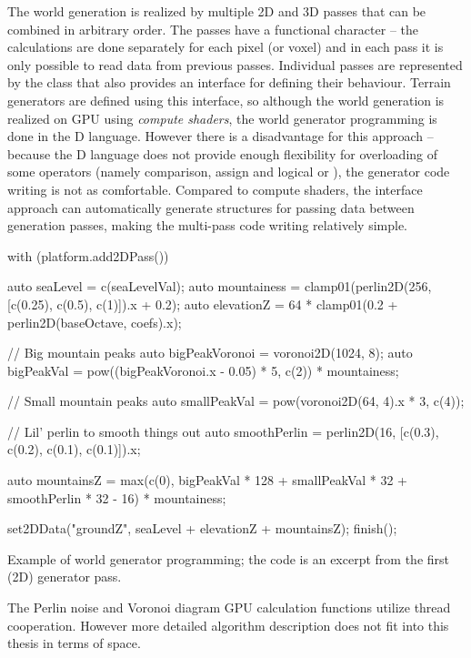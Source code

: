 The world generation is realized by multiple 2D and 3D passes that can be combined in arbitrary order. The passes have a functional character -- the calculations are done separately for each pixel (or voxel) and in each pass it is only possible to read data from previous passes. Individual passes are represented by the class  that also provides an interface for defining their behaviour. Terrain generators are defined using this interface, so although the world generation is realized on GPU using \textit{compute shaders}, the world generator programming is done in the D language. However there is a disadvantage for this approach -- because the D language does not provide enough flexibility for overloading of some operators (namely comparison, assign and logical \inlineDCode{&&} or \inlineDCode{||}), the generator code writing is not as comfortable. Compared to compute shaders, the interface approach can automatically generate structures for passing data between generation passes, making the multi-pass code writing relatively simple.

\begin{codeFloat}[H]
	\begin{dcode}
with (platform.add2DPass()) {
	auto seaLevel = c(seaLevelVal);
	auto mountainess = clamp01(perlin2D(256, [c(0.25), c(0.5), c(1)]).x + 0.2);
	auto elevationZ = 64 * clamp01(0.2 + perlin2D(baseOctave, coefs).x);

	// Big mountain peaks
	auto bigPeakVoronoi = voronoi2D(1024, 8);
	auto bigPeakVal = pow((bigPeakVoronoi.x - 0.05) * 5, c(2)) * mountainess;
	
	// Small mountain peaks
	auto smallPeakVal = pow(voronoi2D(64, 4).x * 3, c(4));
	
	// Lil' perlin to smooth things out
	auto smoothPerlin = perlin2D(16, [c(0.3), c(0.2), c(0.1), c(0.1)]).x;
	
	auto mountainsZ = max(c(0), bigPeakVal * 128 + smallPeakVal * 32 + smoothPerlin * 32 - 16) * mountainess;

	set2DData("groundZ", seaLevel + elevationZ + mountainsZ);
	finish();
}
	\end{dcode}
	\caption{Example of world generator programming; the code is an excerpt from the first (2D)  generator pass.}
\end{codeFloat}

The Perlin noise and Voronoi diagram GPU calculation functions utilize thread cooperation. However more detailed algorithm description does not fit into this thesis in terms of space.

